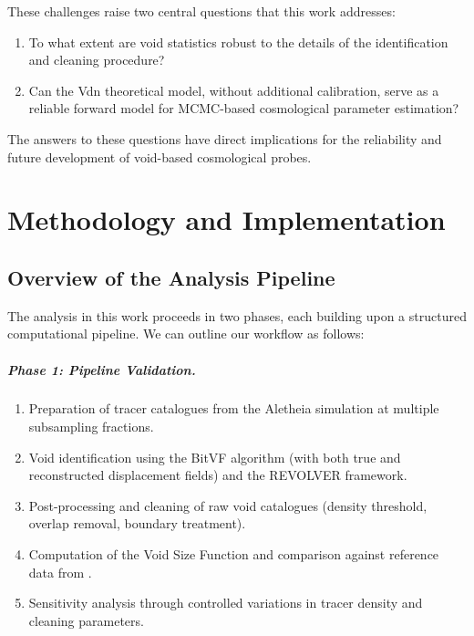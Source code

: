 \documentclass[12pt]{report}
\begin{document}
These challenges raise two central questions that this work addresses:
\begin{enumerate}
    \item To what extent are void statistics robust to the details of the identification and cleaning procedure?
    \item Can the Vdn theoretical model, without additional calibration, serve as a reliable forward model for MCMC-based cosmological parameter estimation?
\end{enumerate}

The answers to these questions have direct implications for the reliability and future development of void-based cosmological probes.


\chapter{Methodology and Implementation}

\section{Overview of the Analysis Pipeline}

The analysis in this work proceeds in two phases, each building upon a structured computational pipeline. We can outline our workflow as follows:

\paragraph{Phase 1: Pipeline Validation.}
\begin{enumerate}
    \item Preparation of tracer catalogues from the Aletheia simulation at multiple subsampling fractions.
    \item Void identification using the BitVF algorithm (with both true and reconstructed displacement fields) and the REVOLVER framework.
    \item Post-processing and cleaning of raw void catalogues (density threshold, overlap removal, boundary treatment).
    \item Computation of the Void Size Function and comparison against reference data from \citet{Sartori2025}.
    \item Sensitivity analysis through controlled variations in tracer density and cleaning parameters.
\end{enumerate}
\end{document}
